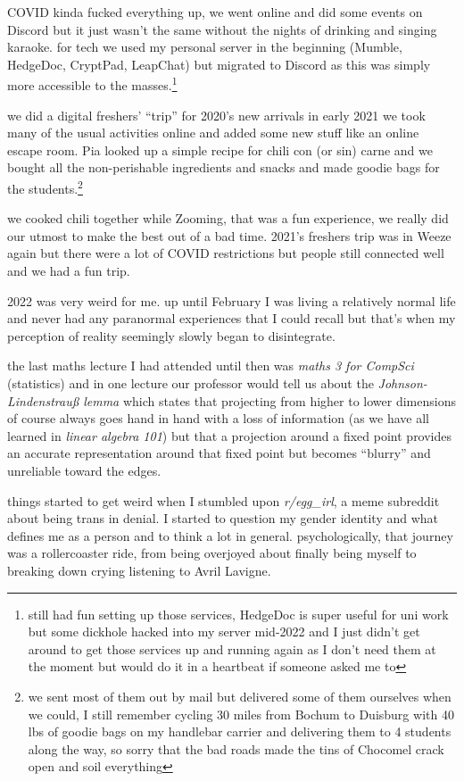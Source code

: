 \documentclass[12pt]{report}
\theoremstyle{definition}
\theoremstyle{remark}
\begin{document}
COVID kinda fucked everything up, we went online and did some events on Discord but it just wasn't the same without the nights of drinking and singing karaoke. for tech we used my personal server in the beginning (Mumble, HedgeDoc, CryptPad, LeapChat) but migrated to Discord as this was simply more accessible to the masses.\footnote{still had fun setting up those services, HedgeDoc is super useful for uni work but some dickhole hacked into my server mid-2022 and I just didn't get around to get those services up and running again as I don't need them at the moment but would do it in a heartbeat if someone asked me to}

we did a digital freshers' ``trip'' for 2020's new arrivals in early 2021
we took many of the usual activities online and added some new stuff like an online escape room. Pia looked up a simple recipe for chili con (or sin) carne and we bought all the non-perishable ingredients and snacks and made goodie bags for the students.\footnote{we sent most of them out by mail but delivered some of them ourselves when we could, I still remember cycling 30 miles from Bochum to Duisburg with 40 lbs of goodie bags on my handlebar carrier and delivering them to 4 students along the way, so sorry that the bad roads made the tins of Chocomel crack open and soil everything}

we cooked chili together while Zooming, that was a fun experience, we really did our utmost to make the best out of a bad time. 2021's freshers trip was in Weeze again but there were a lot of COVID restrictions but people still connected well and we had a fun trip.

2022 was very weird for me. up until February I was living a relatively normal life and never had any paranormal experiences that I could recall but that's when my perception of reality seemingly slowly began to disintegrate.

the last maths lecture I had attended until then was \emph{maths 3 for CompSci} (statistics) and in one lecture our professor would tell us about the \emph{Johnson-Lindenstrauß lemma} which states that projecting from higher to lower dimensions of course always goes hand in hand with a loss of information (as we have all learned in \emph{linear algebra 101}) but that a projection around a fixed point provides an accurate representation around that fixed point but becomes ``blurry'' and unreliable toward the edges.

things started to get weird when I stumbled upon \emph{r/egg\_irl}, a meme subreddit about being trans in denial. I started to question my gender identity and what defines me as a person and to think a lot in general. psychologically, that journey was a rollercoaster ride, from being overjoyed about finally being myself to breaking down crying listening to Avril Lavigne.
\end{document}
